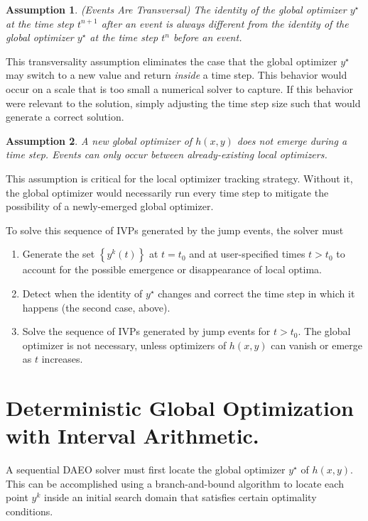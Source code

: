 \documentclass[twoside,leqno, twocolumn]{article}
\newtheorem{assumption}{Assumption}[section]
\begin{document}
\begin{assumption} 
	\label{assume:events-transversal}
	(Events Are Transversal)
	The identity of the global optimizer $y^\star$ at the time step $t^{n+1}$ \textit{after} an event is always different from the identity of the global optimizer $y^\star$ at the time step $t^n$ \textit{before} an event. 
\end{assumption}

This transversality assumption eliminates the case that the global optimizer $y^\star$ may switch to a new value and return \textit{inside} a time step. This behavior would occur on a scale that is too small a numerical solver to capture. If this behavior were relevant to the solution, simply adjusting the time step size such that  would generate a correct solution.

\begin{assumption}
	\label{assume:global-does-not-emerge}
	A new global optimizer of $h(x, y)$ does not emerge during a time step. Events can only occur between already-existing local optimizers.
\end{assumption}

This assumption is critical for the local optimizer tracking strategy. Without it, the global optimizer would necessarily run every time step to mitigate the possibility of a newly-emerged global optimizer.


To solve this sequence of IVPs generated by the jump events, the solver must 
\begin{enumerate}
	\item Generate the set $\left\{y^k(t)\right\}$ at $t=t_0$ and at user-specified times $t>t_0$ to account for the possible emergence or disappearance of local optima.
	\item Detect when the identity of $y^\star$ changes and correct the time step in which it happens (the second case, above).
	\item Solve the sequence of IVPs generated by jump events for $t>t_0$. The global optimizer is not necessary, unless optimizers of $h(x, y)$ can vanish or emerge as $t$ increases.
\end{enumerate}

\section{Deterministic Global Optimization with Interval Arithmetic.}
A sequential DAEO solver must first locate the global optimizer $y^\star$ of $h(x, y)$. This can be accomplished using a branch-and-bound algorithm to locate each point $y^k$ inside an initial search domain that satisfies certain optimality conditions.
\end{document}
